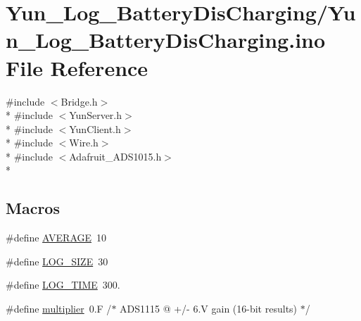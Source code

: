 \hypertarget{Yun__Log__BatteryDisCharging_8ino}{\section{Yun\-\_\-\-Log\-\_\-\-Battery\-Dis\-Charging/\-Yun\-\_\-\-Log\-\_\-\-Battery\-Dis\-Charging.ino File Reference}
\label{Yun__Log__BatteryDisCharging_8ino}
}
{\ttfamily \#include $<$Bridge.\-h$>$}\\*
{\ttfamily \#include $<$Yun\-Server.\-h$>$}\\*
{\ttfamily \#include $<$Yun\-Client.\-h$>$}\\*
{\ttfamily \#include $<$Wire.\-h$>$}\\*
{\ttfamily \#include $<$Adafruit\-\_\-\-A\-D\-S1015.\-h$>$}\\*
\subsection*{Macros}
\begin{DoxyCompactItemize}
\item 
\#define \hyperlink{Yun__Log__BatteryDisCharging_8ino_a1f98b8446b6c3c9f699cc2c046c49f87}{A\-V\-E\-R\-A\-G\-E}~10
\item 
\#define \hyperlink{Yun__Log__BatteryDisCharging_8ino_a609a6de2c7ff0a69b55d3b3c5e260cc5}{L\-O\-G\-\_\-\-S\-I\-Z\-E}~30
\item 
\#define \hyperlink{Yun__Log__BatteryDisCharging_8ino_a4ee9ad6c4757efdc8db0322e3ec0842c}{L\-O\-G\-\_\-\-T\-I\-M\-E}~300.
\item 
\#define \hyperlink{Yun__Log__BatteryDisCharging_8ino_aea45ca95010a5ec1106de8c2e928673e}{multiplier}~0.\-F /$\ast$ A\-D\-S1115  @ +/-\/ 6.\-V gain (16-\/bit results) $\ast$/
\end{DoxyCompactItemize}
